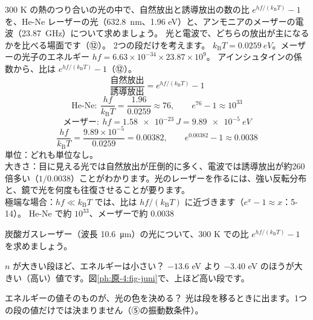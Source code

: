 \label{ph:原-4:ex12}
\begin{phreidai}[自然放出と誘導放出の比]
300 K の熱のつり合いの光の中で、自然放出と誘導放出の数の比 $e^{hf/(k_{\mathrm B}T)}-1$ を、He-Ne レーザーの光（\qty{632.8}{nm}、1.96 eV）と、アンモニアのメーザーの電波（\qty{23.87}{GHz}）について求めましょう。
\phbamen
光と電波で、どちらの放出が主になるかを比べる場面です（⑫）。
\phmushi
2つの段だけを考えます。
\phzu
$k_{\mathrm B}T=\qty{0.0259}{eV}$。メーザーの光子のエネルギー $hf=6.63\times10^{-34}\times23.87\times10^9$。
\phriyu
アインシュタインの係数から、比は $e^{hf/(k_{\mathrm B}T)}-1$（⑫）。
\phtateru
\[ \frac{\text{自然放出}}{\text{誘導放出}}=e^{hf/(k_{\mathrm B}T)}-1 \]
\phtoku
\[ \text{He-Ne}:\ \frac{hf}{k_{\mathrm B}T}=\frac{1.96}{0.0259}\approx76,\qquad e^{76}-1\approx10^{33} \]
\[ \text{メーザー}:\ hf=\qty{1.58e-23}{J}=\qty{9.89e-5}{eV} \]
\[ \frac{hf}{k_{\mathrm B}T}=\frac{9.89\times10^{-5}}{0.0259}=0.00382,\qquad e^{0.00382}-1\approx0.0038 \]
\phtashikame
単位：どれも単位なし。\\
大きさ：目に見える光では自然放出が圧倒的に多く、電波では誘導放出が約260倍多い（$1/0.0038$）ことがわかります。光のレーザーを作るには、強い反転分布と、鏡で光を何度も往復させることが要ります。\\
極端な場合：$hf\ll k_{\mathrm B}T$ では、比は $hf/(k_{\mathrm B}T)$ に近づきます（$e^x-1\approx x$：5-14）。
\kotae He-Ne で約 $10^{33}$、メーザーで約 0.0038
\end{phreidai}
\begin{jibun}
炭酸ガスレーザー（波長 \qty{10.6}{\micro m}）の光について、300 K での比 $e^{hf/(k_{\mathrm B}T)}-1$ を求めましょう。
\end{jibun}

\begin{tsumazuki}{$n$ が大きい段ほど、エネルギーは小さい？}
$-13.6$ eV より $-3.40$ eV のほうが大きい（高い）値です。図\ref{ph:原-4:fig-juni}で、上ほど高い段です。
\end{tsumazuki}

\begin{tsumazuki}{エネルギーの値そのものが、光の色を決める？}
光は段を移るときに出ます。1つの段の値だけでは決まりません（⑤の振動数条件）。
\end{tsumazuki}

